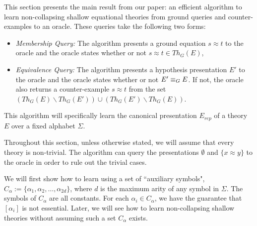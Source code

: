 This section presents the main result from our paper: an efficient algorithm to learn non-collapsing shallow equational theories from ground queries and counter-examples to an oracle.
These queries take the following two forms:
\begin{itemize}
\item \emph{Membership Query:} The algorithm presents a ground equation $s \approx t$ to the oracle and the oracle states whether or not $s \approx t \in Th_G(E)$,
\item \emph{Equivalence Query:} The algorithm presents a hypothesis presentation $E'$ to the oracle and the oracle states whether or not $E' \equiv_G E$. 
If not, the oracle also returns a counter-example $s \approx t$ from the set $(Th_G(E) \backslash Th_G(E')) \cup (Th_G(E') \backslash Th_G(E))$.
\end{itemize} 

This algorithm will specifically learn the canonical presentation $E_{rep}$ of a theory $E$ over a fixed alphabet $\Sigma$.

Throughout this section, unless otherwise stated, we will assume that every theory is non-trivial. 
The algorithm can query the presentations $\emptyset$ and $\{x \approx y\}$ to the oracle in order to rule out the trivial cases.  


We will first show how to learn using a set of ``auxiliary symbols", $C_\alpha := \{\alpha_1, \alpha_2, \dots, \alpha_{2d}\}$, where $d$ is the maximum arity of any symbol in $\Sigma$. 
The symbols of $C_\alpha$ are all constants. 
For each $\alpha_i \in C_\alpha$, we have the guarantee that $[\alpha_i]$ is not essential.%
Later, we will see how to learn non-collapsing shallow theories without assuming such a set $C_\alpha$ exists.

